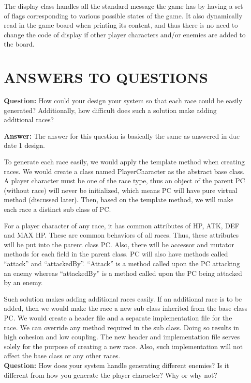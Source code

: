 \documentclass[11pt]{article}
\theoremstyle{plain} \newtheorem{theorem*}{Theorem}[subsection]
\begin{document}
The display class handles all the standard message the game has by having a set
of flags corresponding to various possible states of the game. It also
dynamically read in the game board when printing its content, and thus there is
no need to change the code of display if other player characters and/or enemies
are added to the board.  


\section{ANSWERS TO QUESTIONS}

\textbf{Question:}
How could your design your system so that each race could be easily generated?
Additionally, how difficult does such a solution make adding additional races? 

\textbf{Answer:}
The answer for this question is basically the same as answered in due date 1
design. 

To generate each race easily, we would apply the template method when creating
races. We would create a class named PlayerCharacter as the abstract base
class. A player character must be one of the race type, thus an object of the
parent PC (without race) will never be initialized, which means PC will have
pure virtual method (discussed later). Then, based on the template method, we
will make each race a distinct sub class of PC.  

For a player character of any race, it has common attributes of HP, ATK, DEF
and MAX HP. These are common behaviors of all races. Thus, these attributes
will be put into the parent class PC. Also, there will be accessor and mutator
methods for each field in the parent class. PC will also have methods called
“attack” and “attackedBy”. “Attack” is a method called upon the PC attacking an
enemy whereas “attackedBy” is a method called upon the PC being attacked by an
enemy. 

Such solution makes adding additional races easily. If an additional race is to
be added, then we would make the race a new sub class inherited from the base
class PC. We would create a header file and a separate implementation file for
the race. We can override any method required in the sub class. Doing so
results in high cohesion and low coupling. The new header and implementation
file serves solely for the purpose of creating a new race. Also, such
implementation will not affect the base class or any other races.	\\

\textbf{Question:}
How does your system handle generating different enemies? Is it different from
how you generate the player character? Why or why not? 
\end{document}
